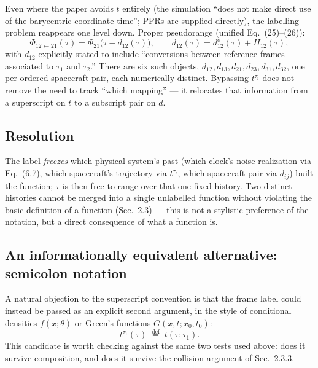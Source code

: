 \documentclass[11pt]{article}
\begin{document}
Even where the paper avoids $t$ entirely (the simulation ``does not
make direct use of the barycentric coordinate time''; PPRs are
supplied directly), the labelling problem reappears one level down.
Proper pseudorange (unified Eq.~(25)--(26)):
\begin{equation*}
  \Phi_{12\leftarrow21}(\tau) = \Phi_{21}\big(\tau - d_{12}(\tau)\big),
  \qquad
  d_{12}(\tau) = d_{12}^{o}(\tau) + H_{12}(\tau),
\end{equation*}
with $d_{12}$ explicitly stated to include ``conversions between
reference frames associated to $\tau_1$ and $\tau_2$.'' There are six
such objects, $d_{12}, d_{13}, d_{21}, d_{23}, d_{31}, d_{32}$, one per
ordered spacecraft pair, each numerically distinct. Bypassing $t^{\tau_i}$
does not remove the need to track ``which mapping'' — it relocates that
information from a superscript on $t$ to a subscript pair on $d$.

\subsection{Resolution}

The label \emph{freezes} which physical system's past (which clock's noise realization via Eq.~(6.7), which spacecraft's trajectory via $t^{\tau_i}$, which spacecraft pair via $d_{ij}$) built the function; $\tau$ is then free to range over that one fixed history. Two distinct histories cannot be merged into a single unlabelled function without violating the basic definition of a function (Sec.~2.3) — this is not a stylistic preference of the notation, but a direct consequence of what a function is.

\subsection{An informationally equivalent alternative: semicolon notation}
\label{subsec:semicolon}

A natural objection to the superscript convention is that the frame
label could instead be passed as an explicit second argument, in the
style of conditional densities $f(x;\theta)$ or Green's functions
$G(x,t;x_0,t_0)$:
\begin{equation*}
  t^{\tau_1}(\tau) \;\stackrel{\text{def}}{=}\; t(\tau;\tau_1).
\end{equation*}
This candidate is worth checking against the same two tests used
above: does it survive composition, and does it survive the collision
argument of Sec.~2.3.3.
\end{document}
